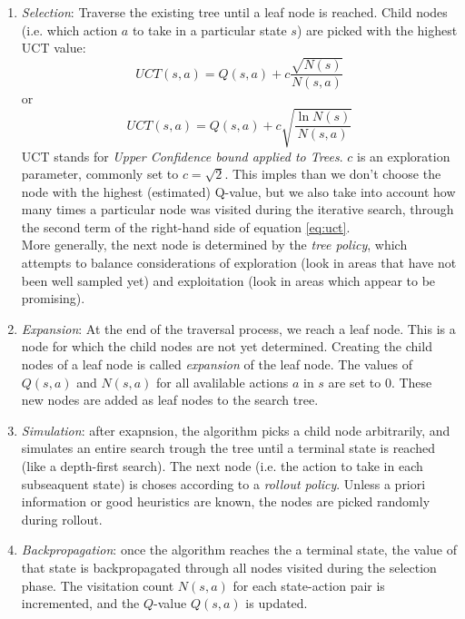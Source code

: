 \documentclass[a4paper,10pt]{article}
\begin{document}
\begin{enumerate}
    \item \emph{Selection}: Traverse the existing tree until a leaf node is reached. Child nodes (i.e. which action $a$ to take in a particular state $s$) are picked with the highest UCT value:
    \begin{equation}
        UCT(s, a) = Q(s, a) + c \frac{\sqrt{N(s)}}{N(s, a)}
        \label{eq:uct}
    \end{equation}
    or
    \begin{equation}
        UCT(s, a) = Q(s, a) + c \sqrt{\frac{\ln{N(s)}}{N(s, a)}}
        \label{eq:uct2}
    \end{equation}
    UCT stands for \emph{Upper Confidence bound applied to Trees}. $c$ is an exploration parameter, commonly set to $c = \sqrt{2}$. This imples than we don't choose the node with the highest (estimated) Q-value, but we also take into account how many times a particular node was visited during the iterative search, through the second term of the right-hand side of equation \ref{eq:uct}.\\
    More generally, the next node is determined by the \emph{tree policy}, which attempts to balance considerations of exploration (look in areas that have not been well sampled yet) and exploitation (look in areas which appear to be promising).
    \item \emph{Expansion}: At the end of the traversal process, we reach a leaf node. This is a node for which the child nodes are not yet determined. Creating the child nodes of a leaf node is called \emph{expansion} of the leaf node. The values of $Q(s, a)$ and $N(s, a)$ for all avalilable actions $a$ in $s$ are set to $0$. These new nodes are added as leaf nodes to the search tree.
    \item \emph{Simulation}: after exapnsion, the algorithm picks a child node arbitrarily, and simulates an entire search trough the tree until a terminal state is reached (like a depth-first search). The next node (i.e. the action to take in each subseaquent state) is choses according to a \emph{rollout policy}. Unless a priori information or good heuristics are known, the nodes are picked randomly during rollout. 
    \item \emph{Backpropagation}: once the algorithm reaches the a terminal state, the value of that state is backpropagated through all nodes visited during the selection phase. The visitation count $N(s, a)$ for each state-action pair is incremented, and the $Q$-value $Q(s, a)$ is updated.
\end{enumerate}
\end{document}
